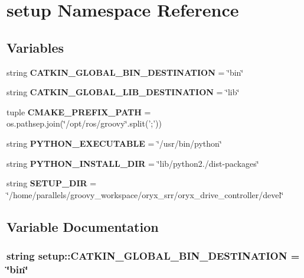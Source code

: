 \section{setup \-Namespace \-Reference}
\label{namespacesetup}
\subsection*{\-Variables}
\begin{DoxyCompactItemize}
\item 
string {\bf \-C\-A\-T\-K\-I\-N\-\_\-\-G\-L\-O\-B\-A\-L\-\_\-\-B\-I\-N\-\_\-\-D\-E\-S\-T\-I\-N\-A\-T\-I\-O\-N} = \char`\"{}bin\char`\"{}
\item 
string {\bf \-C\-A\-T\-K\-I\-N\-\_\-\-G\-L\-O\-B\-A\-L\-\_\-\-L\-I\-B\-\_\-\-D\-E\-S\-T\-I\-N\-A\-T\-I\-O\-N} = \char`\"{}lib\char`\"{}
\item 
tuple {\bf \-C\-M\-A\-K\-E\-\_\-\-P\-R\-E\-F\-I\-X\-\_\-\-P\-A\-T\-H} = os.\-pathsep.\-join(\char`\"{}/opt/ros/groovy\char`\"{}.split(';'))
\item 
string {\bf \-P\-Y\-T\-H\-O\-N\-\_\-\-E\-X\-E\-C\-U\-T\-A\-B\-L\-E} = \char`\"{}/usr/bin/python\char`\"{}
\item 
string {\bf \-P\-Y\-T\-H\-O\-N\-\_\-\-I\-N\-S\-T\-A\-L\-L\-\_\-\-D\-I\-R} = \char`\"{}lib/python2./dist-\/packages\char`\"{}
\item 
string {\bf \-S\-E\-T\-U\-P\-\_\-\-D\-I\-R} = \char`\"{}/home/parallels/groovy\-\_\-workspace/oryx\-\_\-srr/oryx\-\_\-drive\-\_\-controller/devel\char`\"{}
\end{DoxyCompactItemize}


\subsection{\-Variable \-Documentation}
\subsubsection[{\-C\-A\-T\-K\-I\-N\-\_\-\-G\-L\-O\-B\-A\-L\-\_\-\-B\-I\-N\-\_\-\-D\-E\-S\-T\-I\-N\-A\-T\-I\-O\-N}]{\setlength{\rightskip}{0pt plus 5cm}string {\bf setup\-::\-C\-A\-T\-K\-I\-N\-\_\-\-G\-L\-O\-B\-A\-L\-\_\-\-B\-I\-N\-\_\-\-D\-E\-S\-T\-I\-N\-A\-T\-I\-O\-N} = \char`\"{}bin\char`\"{}}\label{namespacesetup_ad6d0d2d2612bf52d17f8f976115653be}


